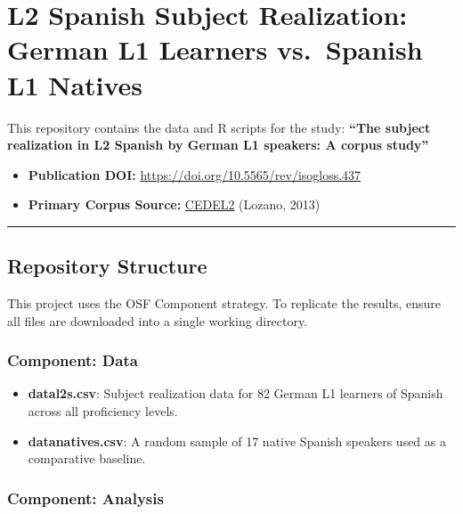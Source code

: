 \documentclass[
  letterpaper,
  DIV=11,
  numbers=noendperiod]{scrartcl}
\author{}
\date{}
\providecommand{\tightlist}{%
  \setlength{\itemsep}{0pt}\setlength{\parskip}{0pt}}
\begin{document}
\section{L2 Spanish Subject Realization: German L1 Learners vs.~Spanish
L1
Natives}\label{l2-spanish-subject-realization-german-l1-learners-vs.-spanish-l1-natives}

This repository contains the data and R scripts for the study:
\textbf{``The subject realization in L2 Spanish by German L1 speakers: A
corpus study''}

\begin{itemize}
\tightlist
\item
  \textbf{Publication DOI:}
  \url{https://doi.org/10.5565/rev/isogloss.437}
\item
  \textbf{Primary Corpus Source:}
  \href{https://cedel2.learnercorpora.com/}{CEDEL2} (Lozano, 2013)
\end{itemize}

\begin{center}\rule{0.5\linewidth}{0.5pt}\end{center}

\subsection{Repository Structure}\label{repository-structure}

This project uses the OSF Component strategy. To replicate the results,
ensure all files are downloaded into a single working directory.

\subsubsection{Component: Data}\label{component-data}

\begin{itemize}
\tightlist
\item
  \textbf{datal2s.csv}: Subject realization data for 82 German L1
  learners of Spanish across all proficiency levels.
\item
  \textbf{datanatives.csv}: A random sample of 17 native Spanish
  speakers used as a comparative baseline.
\end{itemize}

\subsubsection{Component: Analysis}\label{component-analysis}
\end{document}
